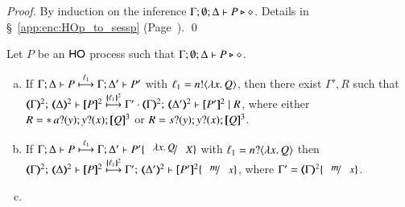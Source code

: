 \begin{proof}
	By induction on the inference $\Gamma; \emptyset; \Delta \proves P \hastype \Proc$. 
	Details in \S~\ref{app:enc:HOp_to_sessp}
	(Page~\pageref{app:enc:HOp_to_sessp}).
	\qed
\end{proof}

\begin{proposition}\rm
	Let $P$ be an  $\HO$ process such that  $\Gamma; \emptyset; \Delta \proves P \hastype \Proc$.
	\begin{enumerate}[a)]
		\item	 
			If  $\stytra{\Gamma}{\ell_1}{\Delta}{P}{\Delta'}{P'}$
			with $\ell_1 = \bactout{n}{\abs{x}Q}$,
			then 
			there exist $\Gamma', R$ such that \\
			$\mapt{\Gamma}^{2};\, \mapt{\Delta}^{2} \proves  \map{P}^{2} 
			\hby{\mapa{\ell_1}^{2}}
			\Gamma' \cdot \mapt{\Gamma}^{2};\, \mapt{\Delta'}^{2} \proves \map{P'}^{2} \Par R$, 
			where either \\
			$R = \repl{} \binp{a}{y} \binp{y}{x} \pmap{Q}{3}$ 
			or $ R = \binp{s}{y} \binp{y}{x} \pmap{Q}{3}$.
		   


		\item	 
			If  $\stytra{\Gamma}{\ell_1}{\Delta}{P}{\Delta'}{P'\subst{\abs{x}Q}{X}}$
			with $\ell_1 = \bactinp{n}{\abs{x}Q}$
			then \\
			$\mapt{\Gamma}^{2};\, \mapt{\Delta}^{2} \proves \map{P}^{2} 
			\hby{\mapa{\ell_1}^{2}}
			\Gamma';\, \mapt{\Delta'}^{2} \proves  \map{P'}^{2}\subst{m}{x}$, 
			where $\Gamma' = \mapt{\Gamma}^{2}\subst{m}{x}$.


		\item	 
{}	   			   


\end{enumerate}
\end{proposition}
